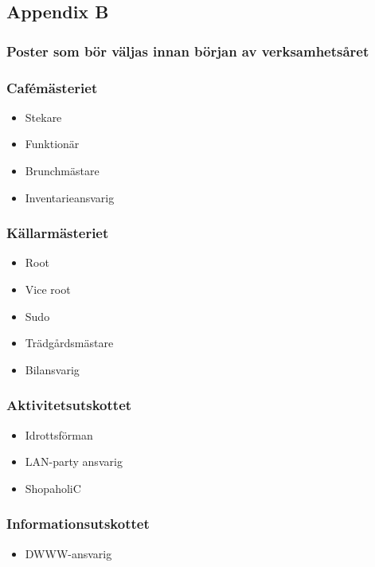 \documentclass{dsekprotokoll}
\begin{document}
\pagebreak
\subsection*{Appendix B}
\subsubsection*{Poster som bör väljas innan början av verksamhetsåret}
\begin{multicols}{2}

    \subsubsection*{Cafémästeriet}
    \begin{itemize}
        \item Stekare
        \item Funktionär
        \item Brunchmästare
        \item Inventarieansvarig
    \end{itemize}

    \subsubsection*{Källarmästeriet}
    \begin{itemize}
        \item Root
        \item Vice root
        \item Sudo
        \item Trädgårdsmästare
        \item Bilansvarig
    \end{itemize}

    \subsubsection*{Aktivitetsutskottet}
    \begin{itemize}
        \item Idrottsförman
        \item LAN-party ansvarig
        \item ShopaholiC
    \end{itemize}

    \subsubsection*{Informationsutskottet}
    \begin{itemize}
        \item DWWW-ansvarig
    \end{itemize}


\end{multicols}
\end{document}
